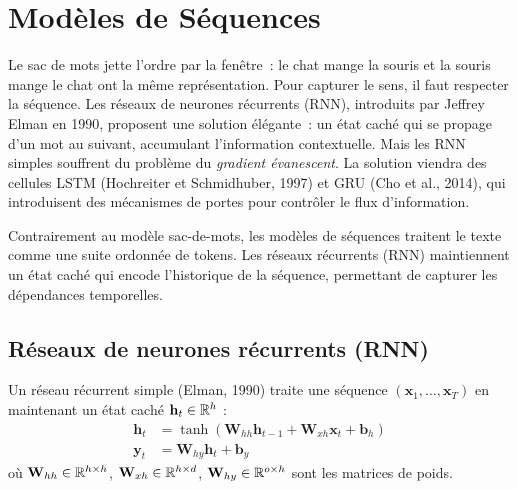 \chapter{Mod\`eles de S\'equences}
\label{ch:sequences}

Le sac de mots jette l'ordre par la fen\^etre~: \og le chat mange la souris \fg et \og la souris mange le chat \fg ont la m\^eme repr\'esentation. Pour capturer le sens, il faut respecter la s\'equence. Les r\'eseaux de neurones r\'ecurrents (RNN), introduits par Jeffrey Elman en 1990, proposent une solution \'el\'egante~: un \'etat cach\'e qui se propage d'un mot au suivant, accumulant l'information contextuelle. Mais les RNN simples souffrent du probl\`eme du \emph{gradient \'evanescent}. La solution viendra des cellules LSTM (Hochreiter et Schmidhuber, 1997) et GRU (Cho et al., 2014), qui introduisent des m\'ecanismes de portes pour contr\^oler le flux d'information.

\begin{intuition}[title=\textbf{Mod\'eliser l'ordre des mots}]
Contrairement au mod\`ele sac-de-mots, les mod\`eles de s\'equences traitent
le texte comme une suite ordonn\'ee de tokens. Les r\'eseaux r\'ecurrents (RNN)
maintiennent un \'etat cach\'e qui encode l'historique de la s\'equence,
permettant de capturer les d\'ependances temporelles.
\end{intuition}

\section{R\'eseaux de neurones r\'ecurrents (RNN)}
\label{sec:seq:rnn}

\begin{definition}
Un r\'eseau r\'ecurrent simple (Elman, 1990) traite une s\'equence
$(\mathbf{x}_1, \ldots, \mathbf{x}_T)$ en maintenant un \'etat cach\'e
$\mathbf{h}_t \in \mathbb{R}^h$ :
\begin{align}
\mathbf{h}_t &= \tanh(\mathbf{W}_{hh} \mathbf{h}_{t-1} + \mathbf{W}_{xh} \mathbf{x}_t + \mathbf{b}_h) \\
\mathbf{y}_t &= \mathbf{W}_{hy} \mathbf{h}_t + \mathbf{b}_y
\end{align}
o\`u $\mathbf{W}_{hh} \in \mathbb{R}^{h \times h}$, $\mathbf{W}_{xh} \in \mathbb{R}^{h \times d}$,
$\mathbf{W}_{hy} \in \mathbb{R}^{o \times h}$ sont les matrices de poids.
\end{definition}

